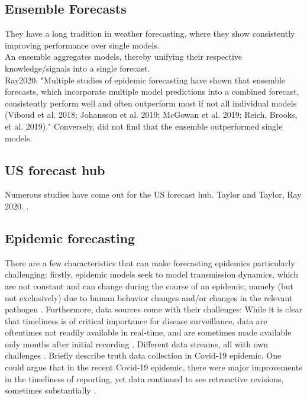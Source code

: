 \subsection{Ensemble Forecasts}
They have a long tradition in weather forecasting, where they show consistently improving performance over single models. \\
An ensemble aggregates models, thereby unifying their respective knowledge/signals into a single forecast.\\
Ray2020: "Multiple studies of epidemic forecasting have shown that ensemble forecasts, which incorporate multiple model predictions into a combined forecast, consistently perform well and often outperform most if not all individual models (Viboud et al. 2018; Johansson et al. 2019; McGowan et al. 2019; Reich, Brooks, et al. 2019)." Conversely, \cite{bracher_pre-registered_2021} did not find that the ensemble outperformed single models.
\subsection{US forecast hub}
Numerous studies have come out for the US forecast hub. Taylor and Taylor, Ray 2020. \cite{ray_ensemble_2020}.
\subsection{Epidemic forecasting}
There are a few characteristics that can make forecasting epidemics particularly challenging: firstly, epidemic models seek to model transmission dynamics, which are not constant and can change during the course of an epidemic, namely (but not exclusively) due to human behavior changes and/or changes in the relevant pathogen \citep{moran_epidemic_2016}. Furthermore, data sources come with their challenges: While it is clear that timeliness is of critical importance for disease surveillance, data are oftentimes not readily available in real-time, and are sometimes made available only months after initial recording \cite{jajosky_evaluation_2004} . Different data streams, all with own challenges \cite{moran_epidemic_2016}. Briefly describe truth data collection in Covid-19 epidemic. One could argue that in the recent Covid-19 epidemic, there were major improvements in the timeliness of reporting, yet data continued to see retroactive revisions, sometimes substantially . 
